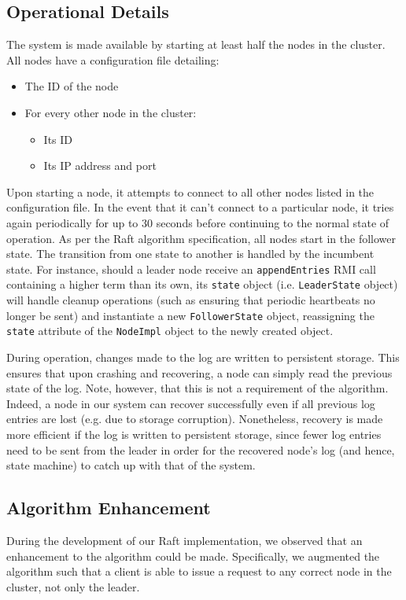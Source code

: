 \documentclass[12pt, a4paper]{article}
\begin{document}
\subsection{Operational Details}
The system is made available by starting at least half the nodes in the cluster. All nodes have a configuration file detailing:
\begin{itemize}
    \item The ID of the node
    \item For every other node in the cluster:
    \begin{itemize}
        \item Its ID
        \item Its IP address and port
    \end{itemize}
\end{itemize}
Upon starting a node, it attempts to connect to all other nodes listed in the configuration file. In the event that it can't connect to a particular node, it tries again periodically for up to 30 seconds before continuing to the normal state of operation. As per the Raft algorithm specification, all nodes start in the follower state. The transition from one state to another is handled by the incumbent state. For instance, should a leader node receive an \texttt{appendEntries} RMI call containing a higher term than its own, its \texttt{state} object (i.e. \texttt{LeaderState} object) will handle cleanup operations (such as ensuring that periodic heartbeats no longer be sent) and instantiate a new \texttt{FollowerState} object, reassigning the \texttt{state} attribute of the \texttt{NodeImpl} object to the newly created object.

During operation, changes made to the log are written to persistent storage. This ensures that upon crashing and recovering, a node can simply read the previous state of the log. Note, however, that this is not a requirement of the algorithm. Indeed, a node in our system can recover successfully even if all previous log entries are lost (e.g. due to storage corruption). Nonetheless, recovery is made more efficient if the log is written to persistent storage, since fewer log entries need to be sent from the leader in order for the recovered node's log (and hence, state machine) to catch up with that of the system.

\subsection{Algorithm Enhancement}
During the development of our Raft implementation, we observed that an enhancement to the algorithm could be made. Specifically, we augmented the algorithm such that a client is able to issue a request to any correct node in the cluster, not only the leader.
\end{document}
